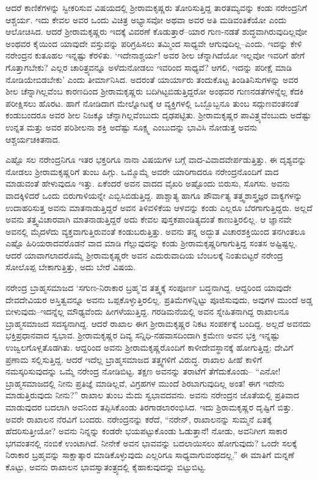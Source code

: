ಆದರೆ ಕಾಣಿಕೆಗಳನ್ನು ಸ್ವೀಕರಿಸುವ ವಿಷಯದಲ್ಲಿ ಶ್ರೀರಾಮಕೃಷ್ಣರು ತೋರಿಸುತ್ತಿದ್ದ ತಾರತಮ್ಯವನ್ನು ಕಂಡು ನರೇಂದ್ರನಿಗೆ ಆಶ್ಚರ್ಯ. ಇದು ಕೇವಲ ಅವರ ಒಂದು ವಿಚಿತ್ರ ಅಭ್ಯಾಸವೋ ಅಥವಾ ಅವರ ಅತಿ ಮಡಿವಂತಿಕೆಯೋ ಎಂದು ಆಲೋಚಿಸಿದ. ಆದರೆ ಶ್ರೀರಾಮಕೃಷ್ಣರು ಇದಕ್ಕೆ ವಿವರಣೆ ಕೊಡುತ್ತಾರೆ–ಯಾರ ಗುಣ-ನಡತೆ ಶುದ್ಧವಾಗಿರುವುದಿಲ್ಲವೋ ಅಂಥವರ ಕೈಯಿಂದ ಯಾವುದೇ ವಸ್ತುವನ್ನು ಪರಿಗ್ರಹಿಸಲು ತಮ್ಮಿಂದ ಸಾಧ್ಯವೇ ಆಗುವುದಿಲ್ಲ–ಎಂದು. ಇದನ್ನು ಕೇಳಿ ನರೇಂದ್ರನ ಕುತೂಹಲ ಇನ್ನಷ್ಟು ಕೆರಳಿತು. ‘ಇದೇನಾಶ್ಚರ್ಯ! ಅವರ ಶೀಲ ಚೆನ್ನಾಗಿದೆಯೋ ಇಲ್ಲವೋ ಇವರಿಗೆ ಹೇಗೆ ಗೊತ್ತಾಗಬೇಕು? ಎಲ್ಲರ ಚಾರಿತ್ರ್ಯವನ್ನೂ ಅಳೆದುನೋಡಲು ಇವರಿಂದ ಸಾಧ್ಯವೆ? ಆಗಲಿ, ಇದನ್ನು ಪರೀಕ್ಷೆ ಮಾಡಿ ನೋಡಿಯೇಬಿಡಬೇಕು’ ಎಂದು ತೀರ್ಮಾನಿಸಿದ. ಅದರಂತೆ ಯಾರ್ಯಾರು ತಂದುಕೊಟ್ಟ ತಿಂಡಿತಿನಿಸುಗಳನ್ನು ಅವರ ಶೀಲ ಚೆನ್ನಾಗಿಲ್ಲವೆಂಬ ಕಾರಣದಿಂದ ಶ್ರೀರಾಮಕೃಷ್ಣರು ಬದಿಗಿಟ್ಟಬಿಡುತ್ತಿದ್ದರೋ ಅಂಥವರ ಗುಣನಡತೆಗಳನ್ನೆಲ್ಲ ಕೆದಕಿ ಪರೀಕ್ಷಿಸಲು ಹೊರಟ. ಹಾಗೆ ನೋಡಿದಾಗ ಮೇಲ್ನೋಟಕ್ಕೆ ಆ ವ್ಯಕ್ತಿಗಳಲ್ಲಿ ಒಬ್ಬೊಬ್ಬನೂ ತುಂಬ ಸದ್ಗುಣವಂತನಂತೆ ಕಂಡುಬಂದರೂ ಅವರ ಶೀಲ ನಿಜಕ್ಕೂ ಚೆನ್ನಾಗಿಲ್ಲವೆಂಬುದು ದೃಢಪಟ್ಟಿತು. ಶ್ರೀರಾಮಕೃಷ್ಣರ ಪಾವಿತ್ರ್ಯವೆಂಬುದು ಅದೆಷ್ಟು ಉನ್ನತ ಮತ್ತು ಅವರ ಪರಿಶೀಲನಾ ಶಕ್ತಿ ಅದೆಷ್ಟು ಸೂಕ್ಷ್ಮ ಎಂಬುದನ್ನು ಭಾವಿಸಿ ನೋಡುತ್ತ ಅವನು ಆಶ್ಚರ್ಯಚಕಿತನಾದ.

ಎಷ್ಟೊ ಸಲ ನರೇಂದ್ರನಿಗೂ ಇತರ ಭಕ್ತರಿಗೂ ನಾನಾ ವಿಷಯಗಳ ಬಗ್ಗೆ ವಾದ-ವಿವಾದವೇರ್ಪಡುತ್ತಿತ್ತು. ಈ ದೃಶ್ಯವನ್ನು ನೋಡಲು ಶ್ರೀರಾಮಕೃಷ್ಣರಿಗೆ ತುಂಬ ಹಿಗ್ಗು. ಒಮ್ಮೊಮ್ಮೆ ಅವರೇ ಯಾರಿಗಾದರೂ ನರೇಂದ್ರನೊಂದಿಗೆ ವಾದ ಮಾಡುವಂತೆ ಹೇಳುವುದೂ ಇತ್ತು. ಏಕೆಂದರೆ ಅವನ ವಾದದ ವೈಖರಿ ಅಷ್ಟೊಂದು ಬಿರುಸು, ಸೊಗಸು. ಅವನು ವಾದಕ್ಕಿಳಿದರೆ ಒಂದು ಬಿರುಗಾಳಿಯನ್ನೇ ಎಬ್ಬಿಸಿಬಿಡುತ್ತಿದ್ದ. ಪಾಶ್ಚಾತ್ಯ ಹಾಗೂ ಪೌರ್ವಾತ್ಯ ತತ್ತ್ವಶಾಸ್ತ್ರಜ್ಞರ ವಾಕ್ಯಗಳನ್ನು ಉದಾಹರಿಸುತ್ತ ಅವನು ಮಾತನಾಡುತ್ತಿದ್ದರೆ ಅವನ ತಿಳಿವಳಿಕೆಯ ಆಳವನ್ನು ಕಂಡು ಎಲ್ಲರೂ ಬೆರಗಾಗುತ್ತಿದ್ದರು. ಅಲ್ಲದೆ ಅವನು ತತ್ತ್ವವಿಚಾರವಾಗಿ ಮಾತನಾಡುತ್ತಿದ್ದರೆ ಅದು ಕೇವಲ ಪುಸ್ತಕಪಾಂಡಿತ್ಯದಂತೆ ಕಾಣುತ್ತಿರಲಿಲ್ಲ. ಆ ಜ್ಞಾನವೇ ಅವನಲ್ಲಿ ಮೈದಳೆದು ವ್ಯಕ್ತವಾಗುತ್ತಿರುವಂತೆ ಕಂಡುಬರುತ್ತಿತ್ತು. ಅವನು ತನ್ನ ಅದ್ಭುತ ವಿಚಾರಶಕ್ತಿಯಿಂದ ತನಗಿಂತಲೂ ಎಷ್ಟೊ ಹಿರಿಯರಾದವರೊಡನೆ ವಾದ ಮಾಡಿ ಗೆಲ್ಲುವುದನ್ನು ಕಂಡು ಶ್ರೀರಾಮಕೃಷ್ಣರಿಗಾಗುತ್ತಿದ್ದ ಸಂತಸ ಅಷ್ಟಿಷ್ಟಲ್ಲ. ಆದರೆ ಯಾವಾಗಲಾದರೊಮ್ಮೆ ಶ್ರೀರಾಮಕೃಷ್ಣರೇ ಅವನ ಎದುರುವಾದಿಯ ಬೆಂಬಲಕ್ಕೆ ನಿಂತುಬಿಟ್ಟರೆ ನರೇಂದ್ರ ಸೋಲೊಪ್ಪ ಬೇಕಾಗುತ್ತಿತ್ತು, ಅದು ಬೇರೆ ವಿಷಯ.

ನರೇಂದ್ರ ಬ್ರಾಹ್ಮಸಮಾಜದ ‘ಸಗುಣ-ನಿರಾಕಾರ ಬ್ರಹ್ಮ’ದ ತತ್ತ್ವಕ್ಕೆ ಸಂಪೂರ್ಣ ಬದ್ಧನಾಗಿದ್ದ. ಆದ್ದರಿಂದ ಯಾವುದೇ ದೇವದೇವಿಯರ ಅಸ್ತಿತ್ವವನ್ನೂ ಅವನು ಒಪ್ಪಕೊಳ್ಳುತ್ತಿರಲಿಲ್ಲ. ಪ್ರತಿಮೆಗಳನ್ನಿಟ್ಟು ಪೂಜಿಸುವುದು, ಅವುಗಳ ಮುಂದೆ ಅಡ್ಡ ಬೀಳುವುದು–ಇದನ್ನೆಲ್ಲ ಮೌಢ್ಯವೆಂದು ಹೀಗಳೆಯುತ್ತಿದ್ದ. ಗರಡಿಮನೆಯಲ್ಲಿ ಅವನ ಸ್ನೇಹಿತನಾಗಿದ್ದ ರಾಖಾಲನೂ ಬ್ರಾಹ್ಮಸಮಾಜದ ಸದಸ್ಯನಾಗಿದ್ದ. ಆದರೆ ರಾಖಾಲ ಈಗ ಶ್ರೀರಾಮಕೃಷ್ಣರ ನಿಕಟ ಸಂಪರ್ಕಕ್ಕೆ ಬಂದಿದ್ದ. ಅಲ್ಲದೆ ಅವನದು ಭಕ್ತಿಪ್ರಧಾನವಾದ ಸ್ವಭಾವ. ಶ್ರೀರಾಮಕೃಷ್ಣರ ದಿವ್ಯ ಸನ್ನಿಧಿ-ನಹವಾಸದಿಂದಾಗಿ ಕ್ರಮೇಣ ಅವನ ಭಕ್ತಿ ಇನ್ನಷ್ಟು ಉಜ್ವಲಗೊಳ್ಲತೊಡಗಿತು. ಆದ್ದರಿಂದ ಅವನು ಶ್ರೀರಾಮಕೃಷ್ಣರೊಂದಿಗೆ ಕಾಳೀದೇವಸ್ಥಾನಕ್ಕೆ ಹೋಗುತ್ತಿದ್ದ; ದೇವಿಗೆ ಪ್ರಣಾಮ ಸಲ್ಲಿಸುತ್ತಿದ್ದ. ಆದರೆ ಇದೆಲ್ಲ ಬ್ರಾಹ್ಮಸಮಾಜದ ತತ್ತ್ವಗಳಿಗೆ ವಿರುದ್ಧ. ರಾಖಾಲ ಹೀಹೆ ಕಾಳಿಗೆ ನಮಸ್ಕರಿಸುವುದನ್ನು ಒಮ್ಮೆ ನರೇಂದ್ರ ನೋಡಿಬಿಟ್ಟ. ತಕ್ಷಣ ಅವನನ್ನು ತರಾಟೆಗೆ ತೆಗೆದುಕೊಂಡು– “ಎನೋ! ಬ್ರಾಹ್ಮಸಮಾಜದಲ್ಲಿ ನೀನು ಪ್ರತಿಜ್ಞೆ ಮಾಡಿಲ್ಲವೆ, ವಿಗ್ರಹಗಳ ಮುಂದೆ ಶಿರಬಾಗುವುದಿಲ್ಲ ಅಂತ! ಈಗ ಇದೇನು ಮಾಡುತ್ತಿರುವುದು ನೀನು?” ರಾಖಾಲ ತುಂಬ ಮೆದು ಸ್ವಭಾವದವನು. ಅವನು ನರೇಂದ್ರನ ಜೊತೆಯಲ್ಲಿ ಪ್ರತಿವಾದ ಮಾಡುವುದರ ಬದಲಾಗಿ ಅವನಿಂದ ತಪ್ಪಿಸಿಕೊಂಡು ತಿರಗಾಡಲಾರಂಭಿಸಿದ. ಇದು ಶ್ರಿರಾಮಕೃಷ್ಣರ ದೃಷ್ಟಿಗೆ ಬಿತ್ತು. ಅವರೇ ರಾಖಾಲನ ನೆರವಿಗೆ ಬಂದರು. ನರೇಂದ್ರನನ್ನು ಕರೆದೆ, “ನರೇನ್, ರಾಖಾಲನನ್ನು ಸುಮ್ಮನೆ ಏತಕ್ಕೆ ಹೆದರಿಸುತ್ತೀಯೋ? ಅವನು ನಿನ್ನನ್ನು ಕಂಡರೇ ಭಯಪಟ್ಟುಕೊಂಡು ಓಡುತ್ತಾನೆ! ನೋಡು, ಅವನಿಗೀಗ ಸಾಕಾರ ಭಗವಂತನಲ್ಲಿ ನಂಬಿಕೆ ಉಂಟಾಗಿದೆ. ನೀನೇಕೆ ಅವನ ಭಾವವನ್ನು ಬದಲಾಯಿಸಲು ಹೋಗುವುದು? ಒಂದೇ ಸಲಕ್ಕೆ ನಿರಾಕಾರ ಬ್ರಹ್ಮವನ್ನು ಸಾಕ್ಷಾತ್ಕಾರ ಮಾಡಿಕೊಳ್ಳುವುದು ಎಲ್ಲರಿಗೂ ಸಾಧ್ಯವಾಗುವಂಥದಲ್ಲ.” ಈ ಮಾತಿಗೆ ಮನ್ನಣೆ ಕೊಟ್ಟು, ಅವನು ರಾಖಾಲನ ಭಾವಸ್ವಾತಂತ್ರ್ಯದಲ್ಲಿ ಕೈಹಾಕುವುದನ್ನು ಬಿಟ್ಟುಬಿಟ್ಟ.


